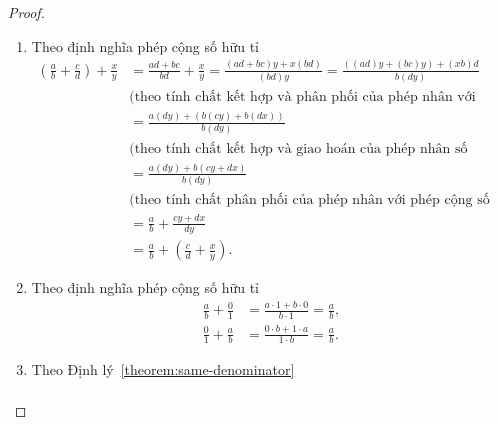 \begin{proof}
    \begin{enumerate}[label={(\roman*)}]
        \item Theo định nghĩa phép cộng số hữu tỉ
              \begin{align*}
                  \left(\frac{a}{b} + \frac{c}{d}\right) + \frac{x}{y} & = \frac{a d + b c}{b d} + \frac{x}{y} = \frac{(a d + b c) y + x (b d)}{(b d) y} = \frac{((a d) y + (b c) y) +  (x b) d}{b (d y)}                                     \\
                                                                       & \text{(theo tính chất kết hợp và phân phối của phép nhân với phép cộng số nguyên)} \\
                                                                       & = \frac{a (d y) + (b (c y) + b(dx))}{b (d y)}                                        \\
                                                                       & \text{(theo tính chất kết hợp và giao hoán của phép nhân số nguyên)}               \\
                                                                       & = \frac{a (d y) + b (c y + dx)}{b (d y)}                                           \\
                                                                       & \text{(theo tính chất phân phối của phép nhân với phép cộng số nguyên)}            \\
                                                                       & = \frac{a}{b} + \frac{c y + dx}{d y}                                               \\
                                                                       & = \frac{a}{b} + \left(\frac{c}{d} + \frac{x}{y}\right).
              \end{align*}
        \item Theo định nghĩa phép cộng số hữu tỉ
              \begin{align*}
                  \frac{a}{b} + \frac{0}{1} & = \frac{a\cdot 1 + b\cdot 0}{b\cdot 1} = \frac{a}{b}, \\
                  \frac{0}{1} + \frac{a}{b} & = \frac{0\cdot b + 1\cdot a}{1\cdot b} = \frac{a}{b}.
              \end{align*}
        \item Theo Định lý~\ref{theorem:same-denominator}
              \begin{align*}

\end{align*}
\end{enumerate}
\end{proof}
